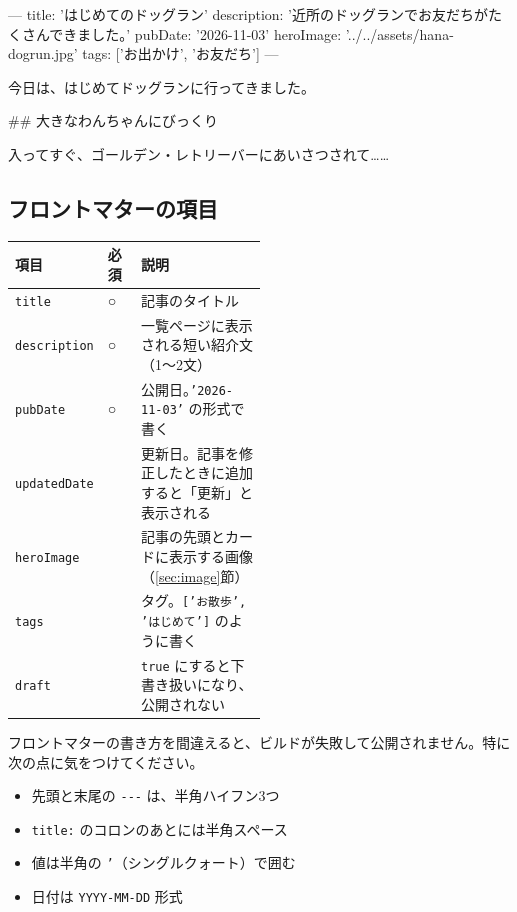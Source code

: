 \documentclass[a4paper,11pt]{ltjsarticle}
\newcommand{\file}[1]{\texttt{#1}}
\begin{document}
\begin{code}
---
title: 'はじめてのドッグラン'
description: '近所のドッグランでお友だちがたくさんできました。'
pubDate: '2026-11-03'
heroImage: '../../assets/hana-dogrun.jpg'
tags: ['お出かけ', 'お友だち']
---

今日は、はじめてドッグランに行ってきました。

## 大きなわんちゃんにびっくり

入ってすぐ、ゴールデン・レトリーバーにあいさつされて……
\end{code}

\subsection{フロントマターの項目}

\begin{center}
\begin{tabular}{@{}llp{0.5\linewidth}@{}}
\toprule
項目 & 必須 & 説明 \\
\midrule
\file{title} & ○ & 記事のタイトル \\
\file{description} & ○ & 一覧ページに表示される短い紹介文（1〜2文） \\
\file{pubDate} & ○ & 公開日。\file{'2026-11-03'} の形式で書く \\
\file{updatedDate} & & 更新日。記事を修正したときに追加すると「更新」と表示される \\
\file{heroImage} & & 記事の先頭とカードに表示する画像（\ref{sec:image}節） \\
\file{tags} & & タグ。\file{['お散歩', 'はじめて']} のように書く \\
\file{draft} & & \file{true} にすると下書き扱いになり、公開されない \\
\bottomrule
\end{tabular}
\end{center}

\begin{hint}[注意]
フロントマターの書き方を間違えると、ビルドが失敗して公開されません。特に次の点に気をつけてください。
\begin{itemize}[nosep]
  \item 先頭と末尾の \texttt{-{}-{}-} は、半角ハイフン3つ
  \item \file{title:} のコロンのあとには半角スペース
  \item 値は半角の \texttt{'}（シングルクォート）で囲む
  \item 日付は \file{YYYY-MM-DD} 形式
\end{itemize}
\end{hint}
\end{document}

